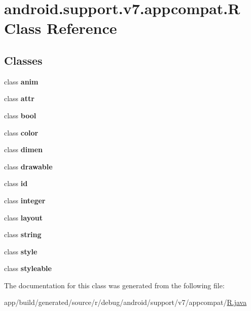 \hypertarget{classandroid_1_1support_1_1v7_1_1appcompat_1_1_r}{}\section{android.\+support.\+v7.\+appcompat.\+R Class Reference}
\label{classandroid_1_1support_1_1v7_1_1appcompat_1_1_r}
\subsection*{Classes}
\begin{DoxyCompactItemize}
\item 
class {\bfseries anim}
\item 
class {\bfseries attr}
\item 
class {\bfseries bool}
\item 
class {\bfseries color}
\item 
class {\bfseries dimen}
\item 
class {\bfseries drawable}
\item 
class {\bfseries id}
\item 
class {\bfseries integer}
\item 
class {\bfseries layout}
\item 
class {\bfseries string}
\item 
class {\bfseries style}
\item 
class {\bfseries styleable}
\end{DoxyCompactItemize}


The documentation for this class was generated from the following file\+:\begin{DoxyCompactItemize}
\item 
app/build/generated/source/r/debug/android/support/v7/appcompat/\hyperlink{app_2build_2generated_2source_2r_2debug_2android_2support_2v7_2appcompat_2_r_8java}{R.\+java}\end{DoxyCompactItemize}

